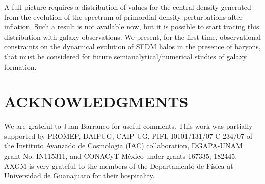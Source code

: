 \documentclass[10pt,a4paper]{article}
\begin{document}
\begin{multicols}{2}
A full picture requires a distribution of values for the central density generated from the evolution of the spectrum of primordial density perturbations after inflation. Such a result is not available now, but it is possible to start tracing this distribution with galaxy observations. We present, for the first time, observational constraints on the dynamical evolution of SFDM halos in the presence of baryons, that must be considered for future semianalytical/numerical studies of galaxy formation.

\section*{ACKNOWLEDGMENTS}
We are grateful to Juan Barranco for useful comments. This work was partially supported by PROMEP, DAIPUG, CAIP-UG, PIFI, I0101/131/07 C-234/07 of the Instituto Avanzado de Cosmologia (IAC) collaboration, DGAPA-UNAM grant No. IN115311, and CONACyT México under grants 167335, 182445. AXGM is very grateful to the members of the Departamento de Física at Universidad de Guanajuato for their hospitality.




\end{multicols}
\end{document}
